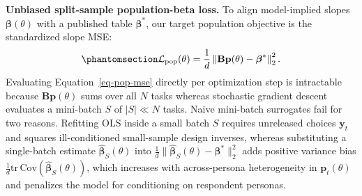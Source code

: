 \documentclass[
  11pt,
  letterpaper,
]{article}
\begin{document}
\textbf{Unbiased split-sample population-beta loss.} To align
model-implied slopes \(\boldsymbol{\beta}(\theta)\) with a published
table \(\boldsymbol{\beta}^*\), our target population objective is the
standardized slope MSE:
\begin{equation}\protect\phantomsection\label{eq-pop-mse}{
\mathcal{L}_{\mathrm{pop}}(\theta) = \frac{1}{d} \left\lVert \mathbf{B}\mathbf{p}(\theta) - \boldsymbol{\beta}^* \right\rVert_2^2.
}\end{equation} Evaluating Equation~\ref{eq-pop-mse} directly per
optimization step is intractable because
\(\mathbf{B}\mathbf{p}(\theta)\) sums over all \(N\) tasks whereas
stochastic gradient descent evaluates a mini-batch \(S\) of
\(|S| \ll N\) tasks. Naive mini-batch surrogates fail for two reasons.
Refitting OLS inside a small batch \(S\) requires unreleased choices
\(\mathbf{y}_t\) and squares ill-conditioned small-sample design
inverses, whereas substituting a single-batch estimate
\(\hat{\boldsymbol{\beta}}_S(\theta)\) into
\(\frac{1}{d}\lVert \hat{\boldsymbol{\beta}}_S(\theta) - \boldsymbol{\beta}^* \rVert_2^2\)
adds positive variance bias
\(\frac{1}{d}\mathrm{tr}\,\mathrm{Cov}(\hat{\boldsymbol{\beta}}_S(\theta))\),
which increases with across-persona heterogeneity in
\(\mathbf{p}_t(\theta)\) and penalizes the model for conditioning on
respondent personas.
\end{document}
